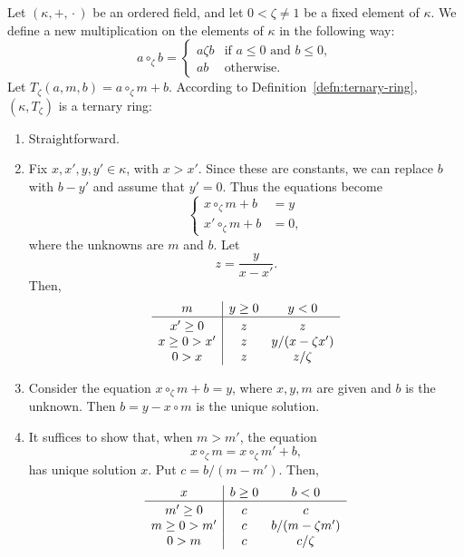 \begin{xmpl}
    Let\/ $(\kappa,+,{}\cdot{})$ be an ordered field, and let\/ $0 < \zeta \ne 1$ be a fixed element of\/ $\kappa$. We define a new multiplication on the elements of\/ $\kappa$ in the following way:
    \[
    a\circ_\zeta b =
    \begin{cases}
        a\zeta b & \text{if } a\le0 \text{ and } b\le 0,\\
        ab & \text{otherwise}.
    \end{cases}
    \]
    Let $T_\zeta(a,m,b)=a\circ_\zeta m+b$. According to Definition~\ref{defn:ternary-ring}, $(\kappa,T_\zeta)$ is a ternary ring:
    \begin{enumerate}[tr$_\arabic*$.,font=\scshape]
        \item Straightforward.
        
        \item Fix $x,x',y,y'\in\kappa$, with $x>x'$. Since these are constants, we can replace $b$ with $b-y'$ and assume that $y'=0$. Thus the equations become
        \[
            \left\{\begin{aligned}
                x\circ_\zeta m+b&=y\\
                x'\circ_\zeta m+b&=0,
            \end{aligned}
            \right.
        \]
        where the unknowns are $m$ and $b$. Let
        \[
            z = \frac y{x-x'}.
        \]
        Then,
        \[
            \begin{array}{c|ccc}
                 m&y\ge0&y<0\\
                 \hline\rule{0pt}{10pt}
                 x'\ge0&z&z\\
                 x\ge0>x'&z&y/(x-\zeta x')\\
                 0>x&z&z/\zeta
            \end{array}
        \]
        \item Consider the equation $x\circ_\zeta m+b=y$, where $x,y,m$ are given and $b$ is the unknown. Then $b=y-x\circ m$ is the unique solution.

        \item It suffices to show that, when $m>m'$, the equation
        \[
                x\circ_\zeta m=
                x\circ_\zeta m'+b,
        \]
        has unique solution $x$. Put $c=b/(m-m')$. Then,
        \[
            \begin{array}{c|ccc}
                 x&b\ge0&b<0\\
                 \hline\rule{0pt}{10pt}
                 m'\ge0&c&c\\
                 m\ge0>m'&c&b/(m-\zeta m')\\
                 0>m&c&c/\zeta
            \end{array}
        \]
    \end{enumerate}
\end{xmpl}

